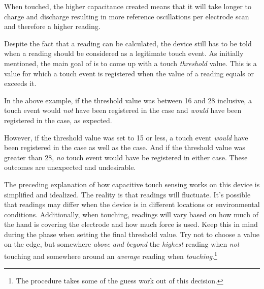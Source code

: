 When touched, the higher capacitance created means that it will take longer to
charge and discharge resulting in more reference oscillations per electrode scan
and therefore a higher reading.

\par\medskip

Despite the fact that a reading can be calculated, the device still has to be
told when a reading should be considered as a legitimate touch event.  As
initially mentioned, the main goal of  is to come up with a touch
\textit{threshold} value.  This is a value for which a touch event is registered
when the value of a reading equals or exceeds it.

\par\medskip

In the above example, if the threshold value was between \num{16} and \num{28}
inclusive, a touch event would \textit{not} have been registered in the
 case and \textit{would} have been registered in the
 case, as expected.

\par\medskip

However, if the threshold value was set to \num{15} or less, a touch event
\textit{would} have been registered in the  case as well
as the  case.  And if the threshold value was greater than
\num{28}, \textit{no} touch event would have be registered in either case.
These outcomes are unexpected and undesirable.

\par\medskip

The preceding explanation of how capacitive touch sensing works on this device is
simplified and idealized.  The reality is that readings will fluctuate.  It's
possible that readings may differ when the device is in different locations or
environmental conditions.  Additionally, when touching, readings will vary based
on how much of the hand is covering the electrode and how much force is used.
Keep this in mind during the  phase when setting the final threshold
value.  Try not to choose a value on the edge, but somewhere
\textit{above and beyond} the \textit{highest} reading when \textit{not}
touching and somewhere around an \textit{average} reading when
\textit{touching}.\footnote{ The  procedure takes some of the guess
work out of this decision.}

